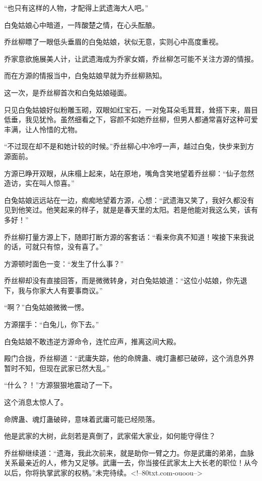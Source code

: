 \begin{this_body}
“也只有这样的人物，才配得上武遗海大人吧。”

白兔姑娘心中暗道，一阵酸楚之情，在心头酝酿。

乔丝柳瞟了一眼低头垂眉的白兔姑娘，状似无意，实则心中高度重视。

乔家意欲施展美人计，让武遗海成为乔家女婿，乔丝柳怎可能不关注方源的情报。

而在方源的情报当中，白兔姑娘早就为乔丝柳熟知。

这一次，是乔丝柳首次和白兔姑娘碰面。

只见白兔姑娘好似粉雕玉砌，双眼如红宝石，一对兔耳朵毛茸茸，耸搭下来，眉目低垂，我见犹怜。虽然细看之下，容颜不如她乔丝柳，但男人都通常喜好这种可爱丰满，让人怜惜的尤物。

“不过现在却不是和她计较的时候。”乔丝柳心中冷哼一声，越过白兔，快步来到方源面前。

方源已睁开双眼，从床榻上起来，站在原地，嘴角含笑地望着乔丝柳：“仙子忽然造访，实在叫人惊喜。”

白兔姑娘远远站在一边，痴痴地望着方源，心想：“武遗海又笑了，我好久都没有见到他笑过。他笑起来的样子，就是是春天里的太阳。若是他能对我这么笑，该有多好！”

乔丝柳打量方源上下，随即打断方源的客套话：“看来你真不知道！唉接下来我说的话，可就只有惊，没有喜了。”

方源顿时面色一变：“发生了什么事？”

乔丝柳却没有直接回答，而是微微转身，对白兔姑娘道：“这位小姑娘，你先退下，我与你家大人有要事商议。”

“啊？”白兔姑娘微微一愣。

方源摆手：“白兔儿，你下去。”

白兔姑娘不敢违逆方源命令，连忙应声，推离这间大殿。

殿门合拢，乔丝柳道：“武庸失踪，他的命牌蛊、魂灯蛊都已破碎，这个消息外界暂时不知，但现在武家已然大乱。”

“什么？！”方源狠狠地震动了一下。

这个消息太惊人了。

命牌蛊、魂灯蛊破碎，意味着武庸可能已经陨落。

他是武家的大树，此刻若是真倒了，武家偌大家业，如何能守得住？

乔丝柳继续道：“遗海，我此次前来，就是助你一臂之力。你是武庸的弟弟，血脉关系最亲近的人，修为又足够。武庸一去，你当接任武家太上大长老的职位！从今以后，你将执掌武家的权柄。”未完待续。<!--80txt.com-ouoou-->

\end{this_body}

